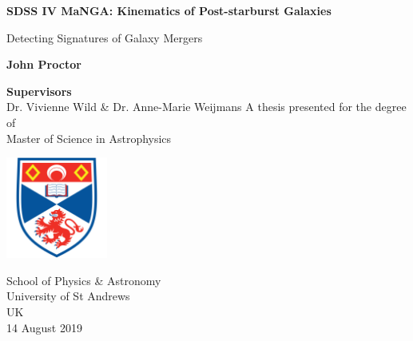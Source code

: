 
\begin{titlepage}
   \begin{center}
       \vspace*{1cm}
        
       \Huge
       \textbf{SDSS IV MaNGA: Kinematics of Post-starburst Galaxies}
 
       \vspace{0.5cm}
       \huge
       Detecting Signatures of Galaxy Mergers 
       \vspace{1.5cm}
 
       \textbf{John Proctor}
       \vfill
       
       \textbf{Supervisors}\\
       Dr. Vivienne Wild \& Dr. Anne-Marie Weijmans
       \vfill
       A thesis presented for the degree of\\
       Master of Science in Astrophysics
 
       \vspace{2.5cm}
 
       \includegraphics[width=0.25\textwidth]{images/University-of-st-andrews-shield.png}
 
       \vspace{2.5cm}
       
       \Large
       School of Physics \& Astronomy\\
       University of St Andrews\\
       UK\\
       14 August 2019
   \end{center}
   
   
\end{titlepage}





